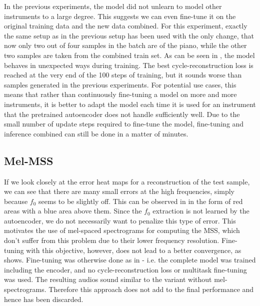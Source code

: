 In the previous experiments, the model did not unlearn to model other instruments to a large degree. This suggests we can even fine-tune it on the original training data and the new data combined. For this experiment, exactly the same setup as in the previous setup has been used  with the only change, that now only two out of four samples in the batch are of the piano, while the other two samples are taken from the combined train set. \newline
As can be seen in , the model behaves in unexpected ways during training. The best cycle-reconstruction loss is reached at the very end of the 100 steps of training, but it sounds worse than samples generated in the previous experiments. For potential use cases, this means that rather than continuously fine-tuning a model on more and more instruments, it is better to adapt the model each time it is used for an instrument that the pretrained autoencoder does not handle sufficiently well. Due to the small number of update steps required to fine-tune the model, fine-tuning and inference combined can still be done in a matter of minutes.


\subsection{Mel-MSS}
\label{mel-mss}

If we look closely at the error heat maps for a reconstruction of the test sample, we can see that there are many small errors at the high frequencies, simply because $f_0$ seems to be slightly off.
This can be observed in  in the form of red areas with a blue area above them.
Since the $f_0$ extraction is not learned by the autoencoder, we do not necessarily want to penalize this type of error. 
This motivates the use of mel-spaced spectrograms for computing the MSS, which don't suffer from this problem due to their lower frequency resolution. Fine-tuning with this objective, however, does not lead to a better convergence, as  shows. Fine-tuning was otherwise done as in  - i.e. the complete model was trained including the encoder, and no cycle-reconstruction loss or multitask fine-tuning was used. The resulting audios sound similar to the variant without mel-spectrograms. Therefore this approach does not add to the final performance and hence has been discarded.

